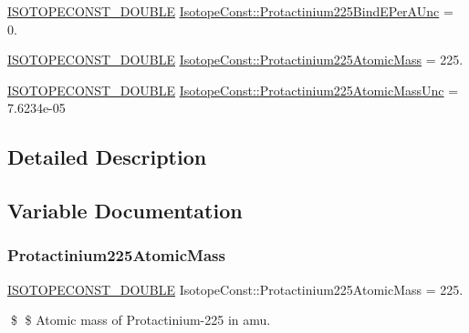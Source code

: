 \begin{DoxyCompactItemize}
\item 
\mbox{\hyperlink{group___isotope_const-_macros_ga8f45a7272ce02c0b4c65c44636ed719a}{I\+S\+O\+T\+O\+P\+E\+C\+O\+N\+S\+T\+\_\+\+D\+O\+U\+B\+LE}} \mbox{\hyperlink{group___isotope_const-_protactinium-_pa225_ga29c3eb9cf0ed9f031efe16f49a5cf052}{Isotope\+Const\+::\+Protactinium225\+Bind\+E\+Per\+A\+Unc}} = 0.
\item 
\mbox{\hyperlink{group___isotope_const-_macros_ga8f45a7272ce02c0b4c65c44636ed719a}{I\+S\+O\+T\+O\+P\+E\+C\+O\+N\+S\+T\+\_\+\+D\+O\+U\+B\+LE}} \mbox{\hyperlink{group___isotope_const-_protactinium-_pa225_gaf116ab10f8cd9b97d66985fdea604aa6}{Isotope\+Const\+::\+Protactinium225\+Atomic\+Mass}} = 225.
\item 
\mbox{\hyperlink{group___isotope_const-_macros_ga8f45a7272ce02c0b4c65c44636ed719a}{I\+S\+O\+T\+O\+P\+E\+C\+O\+N\+S\+T\+\_\+\+D\+O\+U\+B\+LE}} \mbox{\hyperlink{group___isotope_const-_protactinium-_pa225_ga727479ba99281446d5c69d9d744609ca}{Isotope\+Const\+::\+Protactinium225\+Atomic\+Mass\+Unc}} = 7.\+6234e-\/05
\end{DoxyCompactItemize}


\subsection{Detailed Description}


\subsection{Variable Documentation}
\mbox{\label{group___isotope_const-_protactinium-_pa225_gaf116ab10f8cd9b97d66985fdea604aa6}} 
\subsubsection{\texorpdfstring{Protactinium225\+Atomic\+Mass}{Protactinium225AtomicMass}}
{\footnotesize\ttfamily \mbox{\hyperlink{group___isotope_const-_macros_ga8f45a7272ce02c0b4c65c44636ed719a}{I\+S\+O\+T\+O\+P\+E\+C\+O\+N\+S\+T\+\_\+\+D\+O\+U\+B\+LE}} Isotope\+Const\+::\+Protactinium225\+Atomic\+Mass = 225.}

\$ \$ Atomic mass of Protactinium-\/225 in amu. \mbox{\label{group___isotope_const-_protactinium-_pa225_ga727479ba99281446d5c69d9d744609ca}} 
